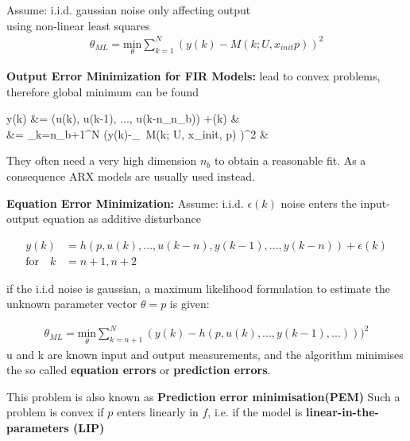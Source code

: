 \begin{tcolorbox}[colback=purple!5!white,colframe=purple!75!black,title=\textbf{Pure Output Error (OE) Minimization}]
	Assume: i.i.d. gaussian noise only affecting output\\
	using non-linear least squares
	\begin{align*}
	\theta_{ML} =\underset{\theta}{\text{min}} \sum_{k=1}^{N} (y(k)-M(k;U, x_{init} p))^2
	\end{align*}
	
	\textbf{Output Error Minimization for FIR Models:}
	lead to convex problems, therefore global minimum can be found
	\begin{flalign*}
	y(k) &= (u(k), u(k-1), ..., u(k-n_{n_b})) \cdot \theta +\varepsilon(k) &\\
	&=  \sum_{k=n_{b}+1}^{N} (y(k)-_{\, M(k; U, x_{init}, p)} \cdot \theta)^2 &
	\end{flalign*}
	
	They often need a very high dimension $n_b$ to obtain a reasonable fit. As a consequence ARX models are usually used instead.
	
	\textbf{Equation Error Minimization:}
	Assume: i.i.d. $\epsilon(k)$ noise enters the input-output equation as additive disturbance
	
	\begin{align*}
	y(k) &= h(p, u(k), ..., u(k-n), y(k-1), ..., y(k-n)) + \epsilon(k)\\
	\text{for} \quad k &= n + 1, n + 2
	\end{align*}
	
	if the i.i.d noise is gaussian, a maximum likelihood formulation to estimate the unknown parameter vector $\theta = p$ is given:
	
	\begin{align*}
	\theta_{ML} = \underset {\theta}{ \text{min} } \sum_{k = n + 1}^{N}{(y(k) - h(p, u(k), ..., y(k-1), ...)) )^2}
	\end{align*}
	u and k are known input and output measurements, and the algorithm minimises the so called \textbf{equation errors} or \textbf{prediction errors}.
	
	This problem is also known as \textbf{Prediction error minimisation(PEM)}
	Such a problem is convex if $p$ enters linearly in $f$, i.e. if the model is \textbf{linear-in-the-parameters (LIP)}
	
	
	

\end{tcolorbox}
